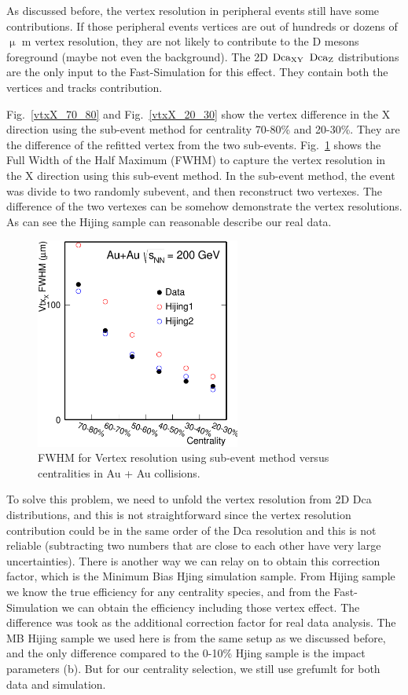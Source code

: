 As discussed before, the vertex resolution in peripheral events still have some contributions. If those peripheral events vertices are out of hundreds or dozens of $\upmu$ m vertex resolution, they are not likely to contribute to the D mesons foreground (maybe not even the background). The 2D $\textup{Dca}_{\textup{XY}}$ $\textup{Dca}_\textup{Z}$ distributions are the only input to the Fast-Simulation for this effect. They contain both the vertices and tracks contribution. 

Fig.~\ref{vtxX_70_80} and Fig.~\ref{vtxX_20_30} show the vertex difference in the X direction using the sub-event method for centrality 70-80\% and 20-30\%. They are the difference of the refitted vertex from the two sub-events. Fig.~\ref{vtxX_vsCent} shows the Full Width of the Half Maximum (FWHM) to capture the vertex resolution in the X direction using this sub-event method. In the sub-event method, the event was divide to two randomly subevent, and then reconstruct two vertexes. The difference of the two vertexes can be somehow demonstrate the vertex resolutions. As can see the Hijing sample can reasonable describe our real data.


\begin{figure}
\centering
\includegraphics[width=0.6\textwidth]{figure/Run14_D0HFT/vtxX_vsCent_pwg.eps}
\caption{ FWHM for Vertex resolution using sub-event method versus centralities in Au + Au collisions.}
\label{vtxX_vsCent} 
\end{figure}

To solve this problem, we need to unfold the vertex resolution from 2D Dca distributions, and this is not straightforward since the vertex resolution contribution could be in the same order of the Dca resolution and this is not reliable (subtracting two numbers that are close to each other have very large uncertainties). There is another way we can relay on to obtain this correction factor, which is the Minimum Bias Hjing simulation sample. From Hijing sample we know the true efficiency for any centrality species, and from the Fast-Simulation we can obtain the efficiency including those vertex effect. The difference was took as the additional correction factor for real data analysis. The MB Hijing sample we used here is from the same setup as we discussed before, and the only difference compared to the 0-10\% Hjing sample is the impact parameters (b). But for our centrality selection, we still use grefumlt for both data and simulation.

